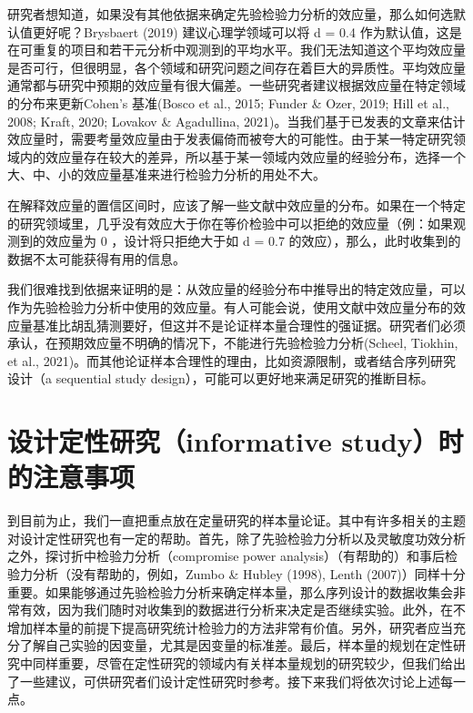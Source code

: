 \documentclass[
  letterpaper,
  DIV=11,
  numbers=noendperiod]{scrreprt}
\begin{document}
研究者想知道，如果没有其他依据来确定先验检验力分析的效应量，那么如何选默认值更好呢？Brysbaert
(2019) 建议心理学领域可以将 d = 0.4
作为默认值，这是在可重复的项目和若干元分析中观测到的平均水平。我们无法知道这个平均效应量是否可行，但很明显，各个领域和研究问题之间存在着巨大的异质性。平均效应量通常都与研究中预期的效应量有很大偏差。一些研究者建议根据效应量在特定领域的分布来更新Cohen's
基准(Bosco et al., 2015; Funder \& Ozer, 2019; Hill et al., 2008; Kraft,
2020; Lovakov \& Agadullina,
2021)。当我们基于已发表的文章来估计效应量时，需要考量效应量由于发表偏倚而被夸大的可能性。由于某一特定研究领域内的效应量存在较大的差异，所以基于某一领域内效应量的经验分布，选择一个大、中、小的效应量基准来进行检验力分析的用处不大。

在解释效应量的置信区间时，应该了解一些文献中效应量的分布。如果在一个特定的研究领域里，几乎没有效应大于你在等价检验中可以拒绝的效应量（例：如果观测到的效应量为
0 ，设计将只拒绝大于如 d = 0.7
的效应），那么，此时收集到的数据不太可能获得有用的信息。

我们很难找到依据来证明的是：从效应量的经验分布中推导出的特定效应量，可以作为先验检验力分析中使用的效应量。有人可能会说，使用文献中效应量分布的效应量基准比胡乱猜测要好，但这并不是论证样本量合理性的强证据。研究者们必须承认，在预期效应量不明确的情况下，不能进行先验检验力分析(Scheel,
Tiokhin, et al.,
2021)。而其他论证样本合理性的理由，比如资源限制，或者结合序列研究设计（a
sequential study design），可能可以更好地来满足研究的推断目标。

\hypertarget{ux8bbeux8ba1ux5b9aux6027ux7814ux7a76informative-studyux65f6ux7684ux6ce8ux610fux4e8bux9879}{%
\section{设计定性研究（informative
study）时的注意事项}\label{ux8bbeux8ba1ux5b9aux6027ux7814ux7a76informative-studyux65f6ux7684ux6ce8ux610fux4e8bux9879}}

到目前为止，我们一直把重点放在定量研究的样本量论证。其中有许多相关的主题对设计定性研究也有一定的帮助。首先，除了先验检验力分析以及灵敏度功效分析之外，探讨折中检验力分析（compromise
power analysis）（有帮助的）和事后检验力分析（没有帮助的，例如，Zumbo \&
Hubley (1998), Lenth
(2007)）同样十分重要。如果能够通过先验检验力分析来确定样本量，那么序列设计的数据收集会非常有效，因为我们随时对收集到的数据进行分析来决定是否继续实验。此外，在不增加样本量的前提下提高研究统计检验力的方法非常有价值。另外，研究者应当充分了解自己实验的因变量，尤其是因变量的标准差。最后，样本量的规划在定性研究中同样重要，尽管在定性研究的领域内有关样本量规划的研究较少，但我们给出了一些建议，可供研究者们设计定性研究时参考。接下来我们将依次讨论上述每一点。
\end{document}
